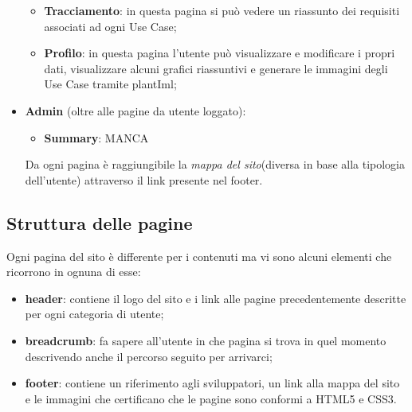 \begin{itemize}
\begin{itemize}
		\item \textbf{Tracciamento}: in questa pagina si può vedere un riassunto dei requisiti associati ad ogni Use Case;
		\item \textbf{Profilo}: in questa pagina l'utente può visualizzare e modificare i propri dati, visualizzare alcuni grafici riassuntivi e generare le immagini degli Use Case tramite plantIml;
	\end{itemize}
	\item \textbf{Admin} (oltre alle pagine da utente loggato):
	\begin{itemize}
		\item \textbf{Summary}: MANCA
	\end{itemize}
Da ogni pagina è raggiungibile la \textit{mappa del sito}(diversa in base alla tipologia dell'utente) attraverso il link presente nel footer.
\end{itemize}
\subsection{Struttura delle pagine}
Ogni pagina del sito è differente per i contenuti ma vi sono alcuni elementi che ricorrono in ognuna di esse:
\begin{itemize}
	\item \textbf{header}: contiene il logo del sito e i link alle pagine precedentemente descritte per ogni categoria di utente;
	\item \textbf{breadcrumb}: fa sapere all'utente in che pagina si trova in quel momento descrivendo anche il percorso seguito per arrivarci;
	\item \textbf{footer}: contiene un riferimento agli sviluppatori, un link alla mappa del sito e le immagini che certificano che le pagine sono conformi a HTML5 e CSS3.
\end{itemize}